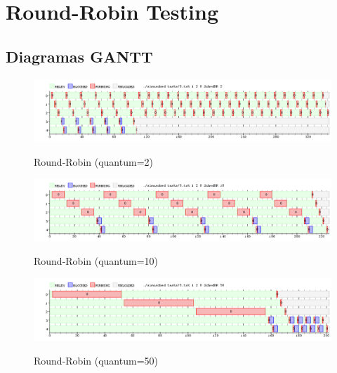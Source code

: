 \section{Round-Robin Testing}

\subsection{Diagramas GANTT}
\begin{figure}[h]
    \includegraphics[width=\linewidth]{images/5_quantum2.png}
    \label{fig:Task Consola}
    \caption{Round-Robin (quantum=2)}
\end{figure}

\begin{figure}[h]
    \includegraphics[width=\linewidth]{images/5_quantum10.png}
    \label{fig:Task Consola}
    \caption{Round-Robin (quantum=10)}
\end{figure}

\begin{figure}[h]
    \includegraphics[width=\linewidth]{images/5_quantum50.png}
    \label{fig:Task Consola}
    \caption{Round-Robin (quantum=50)}
\end{figure}